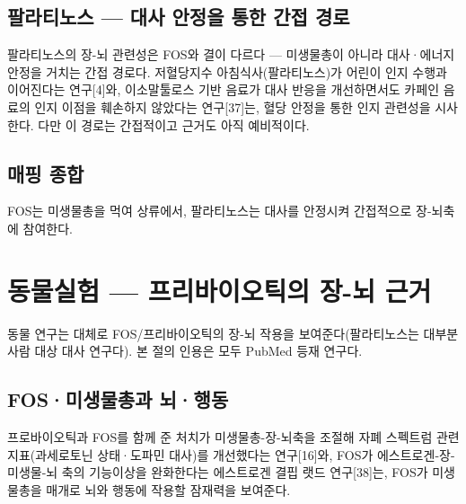 \documentclass[12pt,oneside]{book}
\begin{document}
\subsection{팔라티노스 — 대사 안정을 통한 간접 경로}

팔라티노스의 장-뇌 관련성은 FOS와 결이 다르다 — 미생물총이 아니라 대사·에너지 안정을 거치는 간접 경로다. 저혈당지수 아침식사(팔라티노스)가 어린이 인지 수행과 이어진다는 연구[4]와, 이소말툴로스 기반 음료가 대사 반응을 개선하면서도 카페인 음료의 인지 이점을 훼손하지 않았다는 연구[37]는, 혈당 안정을 통한 인지 관련성을 시사한다. 다만 이 경로는 간접적이고 근거도 아직 예비적이다.

\subsection{매핑 종합}

\vspace{2pt}\vspace{3pt}

FOS는 미생물총을 먹여 상류에서, 팔라티노스는 대사를 안정시켜 간접적으로 장-뇌축에 참여한다.

\section{동물실험 — 프리바이오틱의 장-뇌 근거}

동물 연구는 대체로 FOS/프리바이오틱의 장-뇌 작용을 보여준다(팔라티노스는 대부분 사람 대상 대사 연구다). 본 절의 인용은 모두 PubMed 등재 연구다.

\subsection{FOS·미생물총과 뇌·행동}

프로바이오틱과 FOS를 함께 준 처치가 미생물총-장-뇌축을 조절해 자폐 스펙트럼 관련 지표(과세로토닌 상태·도파민 대사)를 개선했다는 연구[16]와, FOS가 에스트로겐-장-미생물-뇌 축의 기능이상을 완화한다는 에스트로겐 결핍 랫드 연구[38]는, FOS가 미생물총을 매개로 뇌와 행동에 작용할 잠재력을 보여준다.
\end{document}
